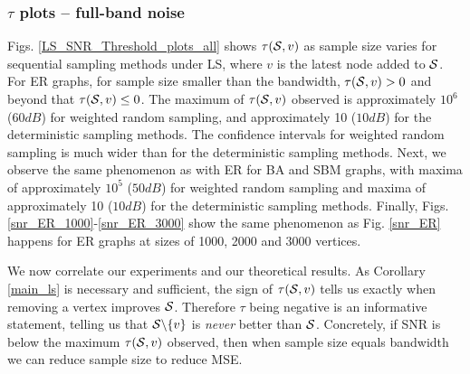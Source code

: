 \clearpage

\subsubsection{$\tau$ plots -- full-band noise}

Figs. \ref{LS_SNR_Threshold_plots_all}  shows $\tau(\mathcal{S},v)$ as sample size varies for sequential sampling methods under LS, where $v$ is the latest node added to $\mathcal{S}$. 
     For ER graphs, for sample size smaller than the bandwidth, $\tau(\mathcal{S},v) > 0$ and beyond that $\tau(\mathcal{S},v) \leq 0$. The maximum of $\tau(\mathcal{S},v)$ observed is approximately $10^{6}$ ($60dB$) for weighted random sampling, and approximately 10 ($10dB$) for the deterministic sampling methods. The confidence intervals for weighted random sampling is much wider than for the deterministic sampling methods.
     Next, we observe the same phenomenon as with ER for BA and SBM graphs, with maxima of approximately $10^5$ ($50dB$) for weighted random sampling and maxima of approximately 10 ($10dB$) for the deterministic sampling methods.
Finally, Figs. \ref{snr_ER_1000}-\ref{snr_ER_3000} show the same phenomenon as Fig. \ref{snr_ER} happens for ER graphs at sizes of 1000, 2000 and 3000 vertices.

 We now correlate our experiments and our theoretical results. As Corollary \ref{main_ls} is necessary and sufficient, the sign of $\tau(\mathcal{S},v)$ tells us exactly when removing a vertex improves $\mathcal{S}$. Therefore $\tau$ being negative is an informative statement, telling us that $\mathcal{S} \backslash \{v\}$ is \emph{never} better than $\mathcal{S}$. Concretely, if SNR is below the maximum $\tau(\mathcal{S},v)$ observed, then when sample size equals bandwidth we can reduce sample size to reduce MSE.

